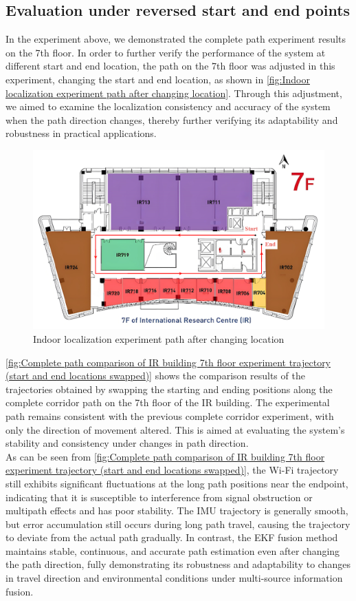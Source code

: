\documentclass[12pt,a4paper]{article}
\numberwithin{equation}{section}
\begin{document}
\subsection{Evaluation under reversed start and end points}
\noindent In the experiment above, we demonstrated the complete path experiment results on the 7th floor. In order to further verify the performance of the system at different start and end location, the path on the 7th floor was adjusted in this experiment, changing the start and end location, as shown in \autoref{fig:Indoor localization experiment path after changing location}. Through this adjustment, we aimed to examine the localization consistency and accuracy of the system when the path direction changes, thereby further verifying its adaptability and robustness in practical applications.
\begin{figure}[H]
    \centering
    \includegraphics[width=0.9\linewidth]{images/ir_full_circle_inverse.png}
    \caption{Indoor localization experiment path after changing location}
    \label{fig:Indoor localization experiment path after changing location}
\end{figure}
\noindent\autoref{fig:Complete path comparison of IR building 7th floor experiment trajectory (start and end locations swapped)} shows the comparison results of the trajectories obtained by swapping the starting and ending positions along the complete corridor path on the 7th floor of the IR building. The experimental path remains consistent with the previous complete corridor experiment, with only the direction of movement altered. This is aimed at evaluating the system's stability and consistency under changes in path direction.\\
As can be seen from \autoref{fig:Complete path comparison of IR building 7th floor experiment trajectory (start and end locations swapped)}, the Wi-Fi trajectory still exhibits significant fluctuations at the long path positions near the endpoint, indicating that it is susceptible to interference from signal obstruction or multipath effects and has poor stability. The IMU trajectory is generally smooth, but error accumulation still occurs during long path travel, causing the trajectory to deviate from the actual path gradually. In contrast, the EKF fusion method maintains stable, continuous, and accurate path estimation even after changing the path direction, fully demonstrating its robustness and adaptability to changes in travel direction and environmental conditions under multi-source information fusion.
\end{document}
